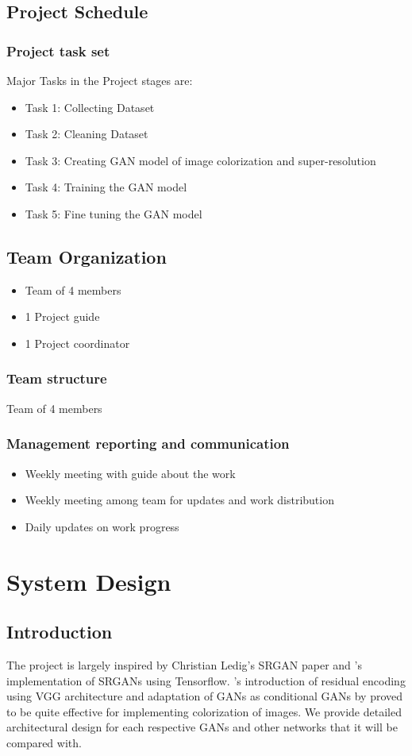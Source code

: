 \documentclass[oneside,a4paper,12pt]{report}
\begin{document}
\newpage
\section{Project Schedule}
\subsection{Project task set}
Major Tasks in the Project stages are:
\begin{itemize}
  \item Task 1: Collecting Dataset
  \item Task 2: Cleaning Dataset
  \item Task 3: Creating GAN model of image colorization and super-resolution
  \item Task 4: Training  the GAN model
  \item Task 5: Fine tuning the GAN model
\end{itemize}


\section{Team Organization}
\begin{itemize}
\item Team of 4 members
\item 1 Project guide
\item 1 Project coordinator
\end{itemize}
\subsection{Team structure}
Team of 4 members

\subsection{Management reporting and communication}
\begin{itemize}
\item Weekly meeting with guide about the work
\item Weekly meeting among team for updates and work distribution
\item Daily updates on work progress
\end{itemize}


\chapter{System Design}
 \section{Introduction}
\hspace*{0.25 in}The project is largely inspired by Christian Ledig's SRGAN paper \citep{ledig2017photorealistic} and \citet{dong2014super}'s implementation of SRGANs using Tensorflow. \citet{dahl2016automatic}'s introduction of residual encoding using VGG architecture and adaptation of GANs as conditional GANs by \citet{mirza2014conditional} proved to be quite effective for implementing colorization of images. We provide detailed architectural design for each respective GANs and other networks that it will be compared with.
\end{document}
